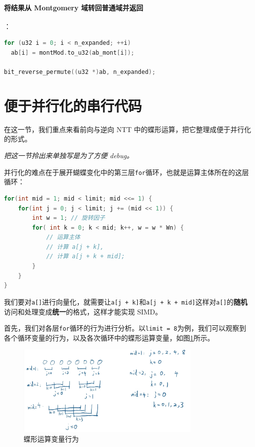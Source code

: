 \documentclass[a4paper]{article}
\begin{document}
\paragraph{将结果从 Montgomery 域转回普通域并返回}

：

\begin{lstlisting}[language=C++]
for (u32 i = 0; i < n_expanded; ++i)
  ab[i] = montMod.to_u32(ab_mont[i]);

bit_reverse_permute((u32 *)ab, n_expanded);
\end{lstlisting}

\section{便于并行化的串行代码}

在这一节，我们重点来看前向与逆向 NTT 中的蝶形运算，把它整理成便于并行化的形式。

\textit{把这一节拎出来单独写是为了方便 debug。}

并行化的难点在于展开蝴蝶变化中的第三层\texttt{for}循环，也就是运算主体所在的这层循环：

\begin{lstlisting}[language=C++]
for(int mid = 1; mid < limit; mid <<= 1) {
    for(int j = 0; j < limit; j += (mid << 1)) {
        int w = 1; // 旋转因子
        for( int k = 0; k < mid; k++, w = w * Wn) {
            // 运算主体
            // 计算 a[j + k],
            // 计算 a[j + k + mid];
        }
    }
}
\end{lstlisting}

我们要对\texttt{a[]}进行向量化，就需要让\texttt{a[j + k]}和\texttt{a[j + k + mid]}这样对\texttt{a[]}的\textbf{随机}访问和处理变成\textbf{统一}的格式，这样才能实现 SIMD。

首先，我们对各层\texttt{for}循环的行为进行分析。以\texttt{limit = 8}为例，我们可以观察到各个循环变量的行为，以及各次循环中的蝶形运算变量，如图\ref{p2}所示。

\begin{figure}[h]
    \centering
    \includegraphics[width=0.8\textwidth]{image/1.png}
    \caption{蝶形运算变量行为}
    \label{p2}
\end{figure}
\end{document}

